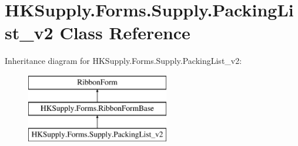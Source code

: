 \hypertarget{class_h_k_supply_1_1_forms_1_1_supply_1_1_packing_list__v2}{}\section{H\+K\+Supply.\+Forms.\+Supply.\+Packing\+List\+\_\+v2 Class Reference}
\label{class_h_k_supply_1_1_forms_1_1_supply_1_1_packing_list__v2}
Inheritance diagram for H\+K\+Supply.\+Forms.\+Supply.\+Packing\+List\+\_\+v2\+:\begin{figure}[H]
\begin{center}
\leavevmode
\includegraphics[height=3.000000cm]{class_h_k_supply_1_1_forms_1_1_supply_1_1_packing_list__v2}
\end{center}
\end{figure}
